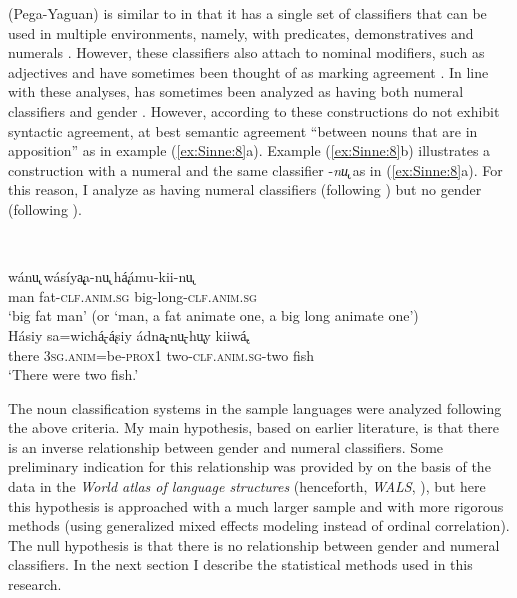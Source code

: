 \documentclass[output=collectionpaper]{langsci/langscibook}
\begin{document}
 (Pega-Yaguan) is similar to  in that it has a single set of classifiers that can be used in multiple environments, namely, with predicates, demonstratives and numerals \citep{Payne2007}. However, these classifiers also attach to nominal modifiers, such as adjectives and have sometimes been thought of as marking agreement \citep[217]{Aikhenvald2000}. In line with these analyses,  has sometimes been analyzed as having both numeral classifiers and gender \citep[136--137]{Nichols1992}. However, according to \citet{Payne2007} these constructions do not exhibit syntactic agreement, at best semantic agreement ``between nouns that are in apposition'' as in example (\ref{ex:Sinne:8}a). Example (\ref{ex:Sinne:8}b) illustrates a construction with a numeral and the same classifier -\textit{nu̢} as in (\ref{ex:Sinne:8}a). For this reason, I analyze  as having numeral classifiers (following \citealt{Gil2013}) but no gender (following \citealt{Payne2007}).

\ea
\label{ex:Sinne:8}
\\
\begin{xlist}
\ex
\gll wánu̢ wásíya̢̢a-nu̢ há̢ámu-kii-nu̢\\
man fat-\textsc{clf.anim.sg} big-long\textsc{{}-clf.anim.sg}\\
\glt `big fat man' (or `man, a fat animate one, a big long animate one')\\
\ex
\gll Hásiy sa=wichá̢-á̢siy ádna̢̢-nu̢-hu̢y kiiwá̢.\\
there 3\textsc{sg.anim}=be-\textsc{prox1} two-\textsc{clf.anim.sg}{}-two fish\\
\glt `There were two fish.'\\
\end{xlist}
\z

The noun classification systems in the sample languages were analyzed following the above criteria. My main hypothesis, based on earlier literature, is that there is an inverse relationship between gender and numeral classifiers. Some preliminary indication for this relationship was provided by \citet[188--189]{Sinnemaeki2014a} on the basis of the data in the \textit{World atlas of language structures} (henceforth, \textit{WALS}, \citealt{Dryer2013}), but here this hypothesis is approached with a much larger sample and with more rigorous methods (using generalized mixed effects modeling instead of ordinal correlation). The null hypothesis is that there is no relationship between gender and numeral classifiers. In the next section I describe the statistical methods used in this research.
\end{document}

